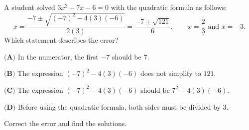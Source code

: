 A student solved $3x^2-7x-6=0$ with the quadratic formula as follows:
\[x=\dfrac{-7\pm\sqrt{(-7)^2-4(3)(-6)}}{2(3)}=\dfrac{-7\pm\sqrt{121}}{6},\qquad x=\dfrac23\text{ and }x=-3.\]
Which statement describes the error?

$\textbf{(A)}$ In the numerator, the first $-7$ should be $7$.

$\textbf{(B)}$ The expression $(-7)^2-4(3)(-6)$ does not simplify to $121$.

$\textbf{(C)}$ The expression $(-7)^2-4(3)(-6)$ should be $7^2-4(3)(-6)$.

$\textbf{(D)}$ Before using the quadratic formula, both sides must be divided by $3$.

Correct the error and find the solutions.

